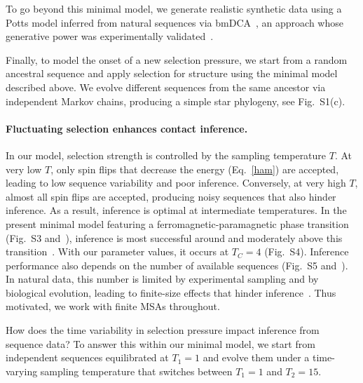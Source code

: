 \documentclass[
 reprint,








nobibnotes,

 amsmath,amssymb,
 aps,
 prl,
 longbibliography






]{revtex4-2}
\begin{document}
To go beyond this minimal model, we generate realistic synthetic data using a Potts model inferred from natural sequences via bmDCA~\cite{Figliuzzi18,Russ20}, an approach whose generative power was experimentally validated~\cite{Russ20}.

Finally, to model the onset of a new selection pressure, we start from a random ancestral sequence and apply selection for structure using the minimal model described above. We evolve different sequences from the same ancestor via independent Markov chains, producing a simple star phylogeny, see Fig.~S1(c).

\paragraph*{Fluctuating selection enhances contact inference.} In our model, selection strength is controlled by the sampling temperature $T$. At very low $T$, only spin flips that decrease the energy (Eq.~\ref{ham}) are accepted, leading to low sequence variability and poor inference. Conversely, at very high $T$, almost all spin flips are accepted, producing noisy sequences that also hinder inference. As a result, inference is optimal at intermediate temperatures. In the present minimal model featuring a ferromagnetic-paramagnetic phase transition (Fig.~S3 and~\cite{Gandarilla20,Dietler2023}), inference is most successful around and moderately above this transition~\cite{Ngampruetikorn22,Dietler2023}. With our parameter values, it occurs at $T_C=4$ (Fig.~S4). Inference performance also depends on the number of available sequences (Fig.~S5 and~\cite{Gandarilla20,Ngampruetikorn22}). In natural data, this number is limited by experimental sampling and by biological evolution, leading to finite-size effects that hinder inference~\cite{Morcos11,Marks11,Ovchinnikov14}. Thus motivated, we work with finite MSAs throughout.

How does the time variability in selection pressure impact inference from sequence data? To answer this within our minimal model, we start from independent sequences equilibrated at $T_{1} = 1$ and evolve them under a time-varying sampling temperature that switches between $T_1 = 1$ and $T_2 = 15$.
\end{document}
